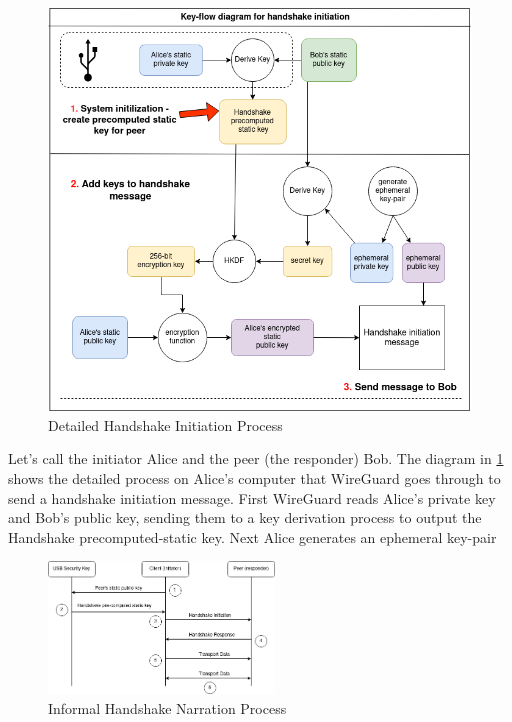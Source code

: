 \documentclass [11pt, proquest] {uwthesis}[2020/02/24]
\begin{document}
\begin{figure}[ht]
\includegraphics[width=15cm]{paper/images/key-flow-wg_with_nitrokey_outline.drawio.png}
\caption{Detailed Handshake Initiation Process}
\label{fig:keyflow}
\end{figure}

Let's call the initiator Alice and the peer (the responder) Bob.
The diagram in \ref{fig:keyflow} shows the detailed process on Alice's computer that WireGuard goes through to send a handshake initiation message. First WireGuard reads Alice's private key and Bob's public key, sending them to a key derivation process to output the Handshake precomputed-static key. Next Alice generates an ephemeral key-pair

\begin{figure}[ht]
\includegraphics[width=6cm]{paper/images/Process_Diagram.drawio.png}
\caption{Informal Handshake Narration Process}
\label{fig:handshake_process}
\end{figure}
\end{document}
